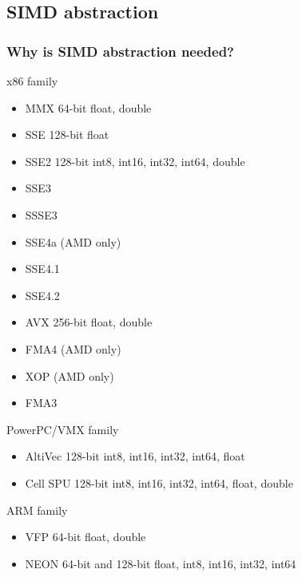 \documentclass{beamer}
\begin{document}
\subsection{SIMD abstraction}
\begin{frame}
	\frametitle{Why is SIMD abstraction needed?}
	
	\begin{multicols}{2}
	
		x86 family
		\begin{itemize}
			\item MMX 64-bit float, double
			\item SSE 128-bit float
			\item SSE2 128-bit int8, int16, int32, int64, double
			\item SSE3
			\item SSSE3
			\item SSE4a (AMD only)
			\item SSE4.1
			\item SSE4.2
			\item AVX 256-bit float, double
			\item FMA4 (AMD only)
			\item XOP (AMD only)
			\item FMA3
		\end{itemize}
		\columnbreak
		
		PowerPC/VMX family
		\begin{itemize}
			\item AltiVec 128-bit int8, int16, int32, int64, float
			\item Cell SPU 128-bit int8, int16, int32, int64, float, double
		\end{itemize}
		
		ARM family
		\begin{itemize}
			\item VFP 64-bit float, double
			\item NEON 64-bit and 128-bit float, int8, int16, int32, int64
		\end{itemize}
		
	\vfill
	\end{multicols}
		
\end{frame}
\end{document}
